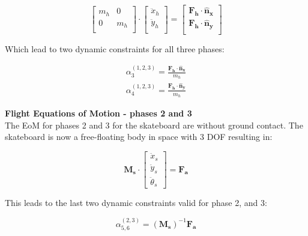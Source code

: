 \documentclass[default,iicol]{sn-jnl}
\begin{document}
\begin{equation}
    \left[\begin{array}{cc}
        m_h & 0 \\
        0 & m_h \\
    \end{array}\right] \cdot \left[\begin{array}{c}
         \ddot x_h  \\
         \ddot y_h \\
    \end{array}\right]=\left[\begin{array}{c}
        \mathbf{F_h}\cdot \mathbf{\hat n_x}  \\
        \mathbf{F_h}\cdot \mathbf{\hat n_y}\\
    \end{array}\right]
\end{equation}

Which lead to two dynamic constraints for all three phases:

\begin{equation}
\begin{split}
        \alpha_{3}^{(1,2,3)} = \frac{\mathbf{F_h}\cdot \mathbf{\hat n_x}}{m_h}\\
        \alpha_{4}^{(1,2,3)} = \frac{\mathbf{F_h}\cdot \mathbf{\hat n_y}}{m_h}
\end{split}
\end{equation}

\textbf{Flight Equations of Motion - phases 2 and 3} \\
\noindent The EoM for phases 2 and 3 for the skateboard are without ground contact. The skateboard is now a free-floating body in space with 3 DOF resulting in:

\begin{equation}\label{e_eomb}
\mathbf{M_s} \cdot \left[\begin{array}{c}
         \ddot x_s  \\
         \ddot y_s \\
         \ddot \theta_s 
    \end{array}\right] =  \mathbf{F_a}
\end{equation}

This leads to the last two dynamic constraints valid for phase 2, and 3:

\begin{equation}
    \alpha_{5,6}^{(2,3)} = (\mathbf{M_s})^{-1}\mathbf{F_a}
\end{equation}
\end{document}
